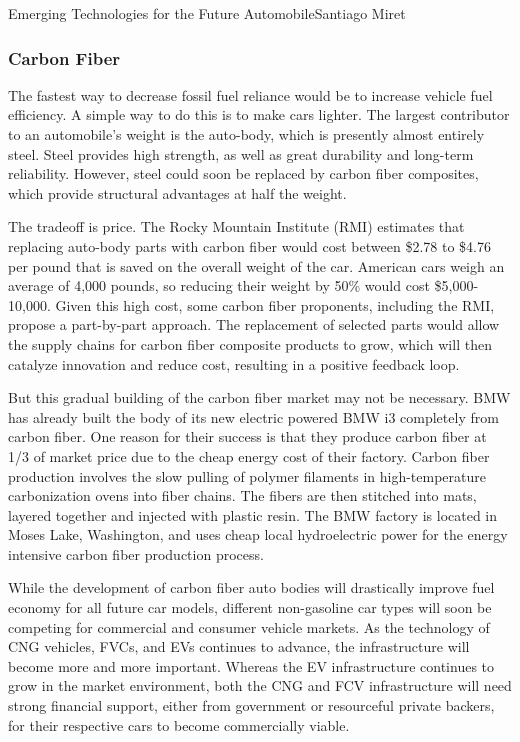 \documentclass[10pt]{papertex}
\begin{document}
\begin{news}{2}{Emerging Technologies for the Future Automobile}{Santiago Miret}{}{}
\subsubsection*{Carbon Fiber}

The fastest way to decrease fossil fuel reliance would be to increase vehicle
fuel efficiency. A simple way to do this is to make cars lighter. The largest
contributor to an automobile's weight is the auto-body, which is presently
almost entirely steel. Steel provides high strength, as well as great durability
and long-term reliability. However, steel could soon be replaced by carbon fiber
composites, which provide structural advantages at half the weight.

The tradeoff is price. The Rocky Mountain Institute (RMI) estimates that
replacing auto-body parts with carbon fiber would cost between \$2.78 to \$4.76
per pound that is saved on the overall weight of the car. American cars weigh an
average of 4,000 pounds, so reducing their weight by 50\% would cost
\$5,000-10,000. Given this high cost, some carbon fiber proponents, including
the RMI, propose a part-by-part approach. The replacement of selected parts
would allow the supply chains for carbon fiber composite products to grow, which
will then catalyze innovation and reduce cost, resulting in a positive feedback
loop.

But this gradual building of the carbon fiber market may not be necessary. BMW
has already built the body of its new electric powered BMW i3 completely from
carbon fiber. One reason for their success is that they produce carbon fiber at
1/3 of market price due to the cheap energy cost of their factory. Carbon fiber
production involves the slow pulling of polymer filaments in high-temperature
carbonization ovens into fiber chains. The fibers are then stitched into mats,
layered together and injected with plastic resin. The BMW factory is located in
Moses Lake, Washington, and uses cheap local hydroelectric power for the energy
intensive carbon fiber production process.

While the development of carbon fiber auto bodies will drastically improve fuel
economy for all future car models, different non-gasoline car types will soon be
competing for commercial and consumer vehicle markets. As the technology of CNG
vehicles, FVCs, and EVs continues to advance, the infrastructure will become
more and more important. Whereas the EV infrastructure continues to grow in the
market environment, both the CNG and FCV infrastructure will need strong
financial support, either from government or resourceful private backers, for
their respective cars to become commercially viable.


\end{news}
\end{document}
